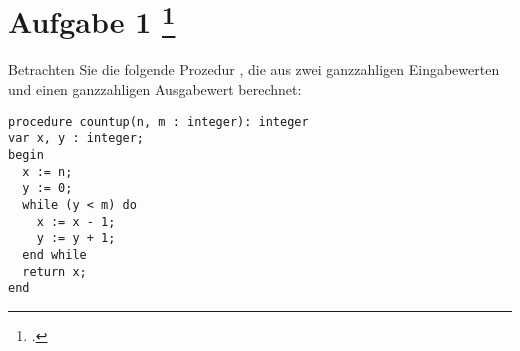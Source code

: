 \documentclass{lehramt-informatik-aufgabe}
\begin{document}

\section{Aufgabe 1
\footcite{examen:66115:2020:09}}

Betrachten Sie die folgende Prozedur , die aus zwei
ganzzahligen Eingabewerten  und  einen ganzzahligen
Ausgabewert berechnet:

\begin{verbatim}
procedure countup(n, m : integer): integer
var x, y : integer;
begin
  x := n;
  y := 0;
  while (y < m) do
    x := x - 1;
    y := y + 1;
  end while
  return x;
end
\end{verbatim}
\end{document}
